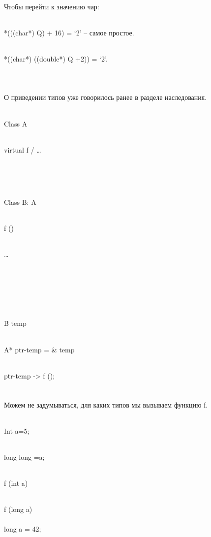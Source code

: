 \documentclass[a4paper,10pt]{article}
\begin{document}
\\Чтобы перейти к значению чар:

\\*(((char*) Q) + 16) = ‘2’ – самое простое.

\\*((char*) ((double*) Q +2)) = ‘2’.
\\
\\
\\

\\О приведении типов уже говорилось ранее в разделе наследования. 
\\

\hline

\\Class A {

\\virtual f / {…}

\\}
\\

\\Class B: A {

\\f () {

\\…

\\}

\\}
\\

\\B temp

\\A* ptr-temp = & temp

\\ptr-temp -> f ();
\\
\hline
\\


\\Можем не задумываться, для каких типов мы вызываем функцию f. 
\\

\hline

\\Int a=5;

\\long long =a;

\\f (int a)

\\f (long a)
\\


\\long a = 42;
\end{document}

